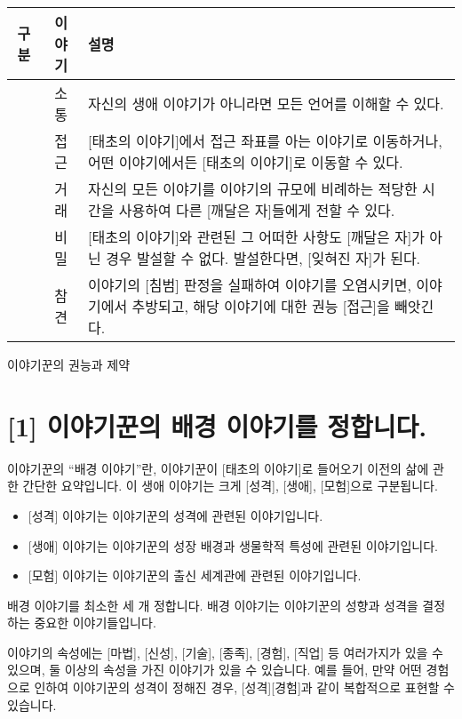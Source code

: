 \documentclass[12pt]{report}
\begin{document}
	\begin{tabularx}{\textwidth}{c|c|X}
		\hline
		\textbf{구분} & \textbf{이야기} & \textbf{설명} \\ \hline \hline
		[권능] & 소통 & 자신의 생애 이야기가 아니라면 모든 언어를 이해할 수 있다. \\ \hline
		[권능] & 접근 & [태초의 이야기]에서 접근 좌표를 아는 이야기로 이동하거나, 어떤 이야기에서든 [태초의 이야기]로 이동할 수 있다. \\ \hline
		[권능] & 거래 & 자신의 모든 이야기를 이야기의 규모에 비례하는 적당한 시간을 사용하여 다른 [깨달은 자]들에게 전할 수 있다. \\ \hline
		[제약] & 비밀 & [태초의 이야기]와 관련된 그 어떠한 사항도 [깨달은 자]가 아닌 경우 발설할 수 없다. 발설한다면, [잊혀진 자]가 된다. \\ \hline
		[제약] & 참견 & 이야기의 [침범] 판정을 실패하여 이야기를 오염시키면, 이야기에서 추방되고, 해당 이야기에 대한 권능 [접근]을 빼앗긴다. \\\hline
	\end{tabularx}
	
	\begin{center}
		이야기꾼의 권능과 제약
	\end{center}
	
	\section*{[1] 이야기꾼의 배경 이야기를 정합니다.}
	
	이야기꾼의 “배경 이야기”란, 이야기꾼이 [태초의 이야기]로 들어오기 이전의 삶에 관한 간단한 요약입니다. 이 생애 이야기는 크게 [성격], [생애], [모험]으로 구분됩니다.
	\begin{itemize}[label={-}]
		\item {}[성격] 이야기는 이야기꾼의 성격에 관련된 이야기입니다.
		\item {}[생애] 이야기는 이야기꾼의 성장 배경과 생물학적 특성에 관련된 이야기입니다.
		\item {}[모험] 이야기는 이야기꾼의 출신 세계관에 관련된 이야기입니다.
	\end{itemize}
	
	배경 이야기를 최소한 세 개 정합니다. 배경 이야기는 이야기꾼의 성향과 성격을 결정하는 중요한 이야기들입니다.
	
	이야기의 속성에는 [마법], [신성], [기술], [종족], [경험], [직업] 등 여러가지가 있을 수 있으며, 둘 이상의 속성을 가진 이야기가 있을 수 있습니다. 예를 들어, 만약 어떤 경험으로 인하여 이야기꾼의 성격이 정해진 경우, [성격][경험]과 같이 복합적으로 표현할 수 있습니다.
	
\end{document}
